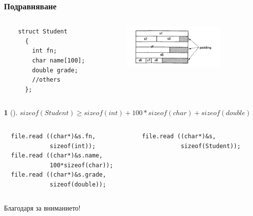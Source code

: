 \documentclass{beamer}
\newtheorem*{remark}{}
\begin{document}
\begin{frame}[fragile]
\frametitle{Подравняване}

\vspace{-20px}



\begin{columns}[t]
  \begin{column}{0.6\textwidth}

\begin{flushleft}
\begin{lstlisting}
    struct Student
      {
        int fn;
        char name[100];
        double grade;
        //others
      };
\end{lstlisting}
\end{flushleft}   

  \end{column}
  \begin{column}{0.4\textwidth}
\begin{flushright}
  \includegraphics[width=5.0cm]{images/padding}
\end{flushright}

  \end{column}
\end{columns}

\begin{remark}[]
    $sizeof(Student) \ge sizeof (int)+100*sizeof(char)+sizeof(double)$
\end{remark}      


\begin{columns}[t]
  \begin{column}{0.5\textwidth}

\begin{flushleft}
\begin{lstlisting}
  file.read ((char*)&s.fn,
             sizeof(int));
  file.read ((char*)&s.name,
             100*sizeof(char));
  file.read ((char*)&s.grade,
             sizeof(double));
\end{lstlisting}
\end{flushleft}   

  \end{column}
  \begin{column}{0.5\textwidth}


\begin{flushleft}
\begin{lstlisting}
  file.read ((char*)&s,
             sizeof(Student));
\end{lstlisting}
\end{flushleft}   

  \end{column}
\end{columns}

\end{frame}


\begin{frame}
\centerline{Благодаря за вниманието!}
\end{frame}
\end{document}
